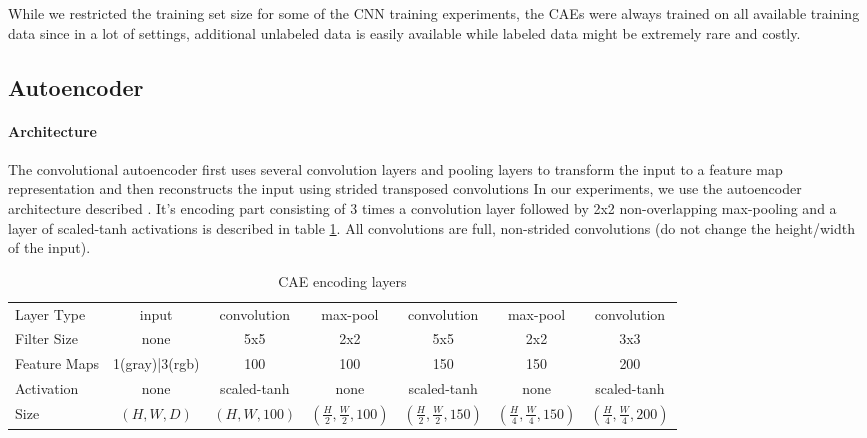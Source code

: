 \documentclass{article}
\begin{document}
  While we restricted the training set size for some of the CNN training experiments, the CAEs were always trained on all available training data since in a lot of settings, additional unlabeled data is easily available while labeled data might be extremely rare and costly.  

  \subsection{Autoencoder}

    \paragraph{Architecture}
    The convolutional autoencoder first uses several convolution layers and pooling layers to transform the input to a feature map representation and then reconstructs the input using strided transposed convolutions 
    In our experiments, we use the autoencoder architecture described \citep{TODO:add_stacked_conv_citation}. It's encoding part consisting of 3 times a convolution layer followed by 2x2 non-overlapping max-pooling and a layer of scaled-tanh activations is described in table \ref{table:encoding_architecture}. All convolutions are full, non-strided convolutions (do not change the height/width of the input). 

    \begin{table}[h]
      \begin{center}
        \begin{tabular}{ l|c c c c c c }
          Layer Type    &   input   & convolution     & max-pool  & convolution & max-pool  & convolution \\
          Filter Size   &   none    & 5x5             & 2x2       & 5x5         & 2x2       & 3x3         \\
          Feature Maps&   1(gray)|3(rgb)   & 100             & 100       & 150         & 150       & 200         \\
          Activation    &   none    & scaled-tanh     & none      & scaled-tanh & none      & scaled-tanh \\
          Size          & $(H,W,D)$ & $(H,W,100)$     & $(\frac{H}{2}, \frac{W}{2}, 100)$ & $(\frac{H}{2}, \frac{W}{2}, 150)$ & $(\frac{H}{4}, \frac{W}{4}, 150)$ & $(\frac{H}{4}, \frac{W}{4}, 200)$
        \end{tabular}
      \end{center}
      \caption{CAE encoding layers}
      \label{table:encoding_architecture}
    \end{table}
\end{document}
